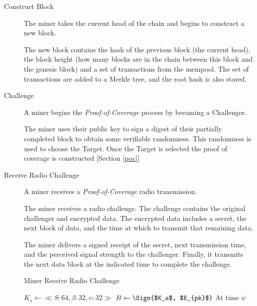 \documentclass[10pt, nonatbib, nocopyrightspace, reprint]{sigplanconf}
\begin{document}
\begin{description}
  \item [Construct Block] The miner takes the current head of the chain and begins to construct a new block.

    The new block contains the hash of the previous block (the current head), the block height (how many blocks are in the chain between this block and the genesis block) and a set of transactions from the mempool. The set of transactions are added to a Merkle tree, and the root hash is also stored.

  \item [Challenge] A miner begins the \emph{Proof-of-Coverage} process by becoming a Challenger.

    The miner uses their public key to sign a digest of their partially completed block to obtain some verifiable randomness. This randomness is used to choose the Target. Once the Target is selected the proof of coverage is constructed [Section \ref{poc}]

  \item [Receive Radio Challenge] A miner receives a \emph{Proof-of-Coverage} radio transmission.

    The miner receives a radio challenge. The challenge contains the original challenger and encrypted data. The encrypted data includes a secret, the next block of data, and the time at which to transmit that remaining data.

    The miner delivers a signed receipt of the secret, next transmission time, and the perceived signal strength to the challenger. Finally, it transmits the next data block at the indicated time to complete the challenge.

    \begin{algorithm}[!htb]
      \DontPrintSemicolon
      \caption{Miner Receive Radio Challenge}\label{proto:miner.recv.challenge.radio}

       {
         {
           {
            $K_s \leftarrow \ll S:64, \beta:32, \upsilon:32 \gg $\;
            $B \leftarrow \Sign{$K_s$, $E_{pk}$} $\;
            \;
            At time $\psi$ \;
          }
        }
      }
    \end{algorithm}
    \FloatBarrier


\end{description}
\end{document}
